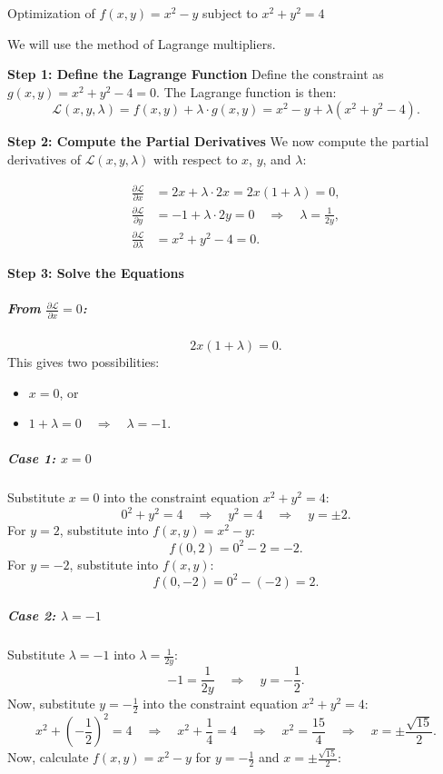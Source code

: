 \Exercise Optimization of $f(x, y) = x^2 - y$ subject to $x^2 + y^2 = 4$

\Answer 

We will use the method of Lagrange multipliers.

{\bf Step 1: Define the Lagrange Function}
Define the constraint as $g(x, y) = x^2 + y^2 - 4 = 0$. The Lagrange function is then:
\[
\mathcal{L}(x, y, \lambda) = f(x, y) + \lambda \cdot g(x, y) = x^2 - y + \lambda(x^2 + y^2 - 4).
\]

{\bf Step 2: Compute the Partial Derivatives}
We now compute the partial derivatives of $\mathcal{L}(x, y, \lambda)$ with respect to $x$, $y$, and $\lambda$:

\begin{align*}
\frac{\partial \mathcal{L}}{\partial x} &= 2x + \lambda \cdot 2x = 2x(1 + \lambda) = 0, \\
\frac{\partial \mathcal{L}}{\partial y} &= -1 + \lambda \cdot 2y = 0 \quad \Rightarrow \quad \lambda = \frac{1}{2y}, \\
\frac{\partial \mathcal{L}}{\partial \lambda} &= x^2 + y^2 - 4 = 0.
\end{align*}

{\bf Step 3: Solve the Equations}

\subparagraph{From $\frac{\partial \mathcal{L}}{\partial x} = 0$:}
\[
2x(1 + \lambda) = 0.
\]
This gives two possibilities:
\begin{itemize}
  \item $x = 0$, or
  \item $1 + \lambda = 0 \quad \Rightarrow \quad \lambda = -1$.
\end{itemize}


\subparagraph{Case 1: $x = 0$}
Substitute $x = 0$ into the constraint equation $x^2 + y^2 = 4$:
\[
0^2 + y^2 = 4 \quad \Rightarrow \quad y^2 = 4 \quad \Rightarrow \quad y = \pm 2.
\]
For $y = 2$, substitute into $f(x, y) = x^2 - y$:
\[
f(0, 2) = 0^2 - 2 = -2.
\]
For $y = -2$, substitute into $f(x, y)$:
\[
f(0, -2) = 0^2 - (-2) = 2.
\]

\subparagraph{Case 2: $\lambda = -1$}
Substitute $\lambda = -1$ into $\lambda = \frac{1}{2y}$:
\[
-1 = \frac{1}{2y} \quad \Rightarrow \quad y = -\frac{1}{2}.
\]
Now, substitute $y = -\frac{1}{2}$ into the constraint equation $x^2 + y^2 = 4$:
\[
x^2 + \left(-\frac{1}{2}\right)^2 = 4 \quad \Rightarrow \quad x^2 + \frac{1}{4} = 4 \quad \Rightarrow \quad x^2 = \frac{15}{4} \quad \Rightarrow \quad x = \pm \frac{\sqrt{15}}{2}.
\]
Now, calculate $f(x, y) = x^2 - y$ for $y = -\frac{1}{2}$ and $x = \pm \frac{\sqrt{15}}{2}$:

